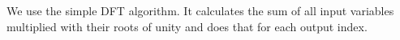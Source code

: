 We use the simple DFT algorithm. It calculates the sum of all input variables multiplied with their roots of unity and does that for each output index.
